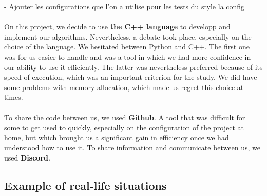 \documentclass{article}
\begin{document}
    -  Ajouter les configurations que l'on a utilise pour les tests du style la config\\ \\
    On this project, we decide to use \textbf{the C++ language} to developp and implement our algorithms. Nevertheless, a debate took place, especially on the choice of the language. We hesitated between Python and C++. The first one was for us easier to handle and was a tool in which we had more confidence in our ability to use it efficiently. The latter was nevertheless preferred because of its speed of execution, which was an important criterion for the study. We did have some problems with memory allocation, which made us regret this choice at times.  \\ \\
    To share the code between us, we used \textbf{Github}\footnotemark. A tool that was difficult for some to get used to quickly, especially on the configuration of the project at home, but which brought us a significant gain in efficiency once we had understood how to use it. To share information and communicate between us, we used \textbf{Discord}.
    


\subsection{Example of real-life situations}
\end{document}
